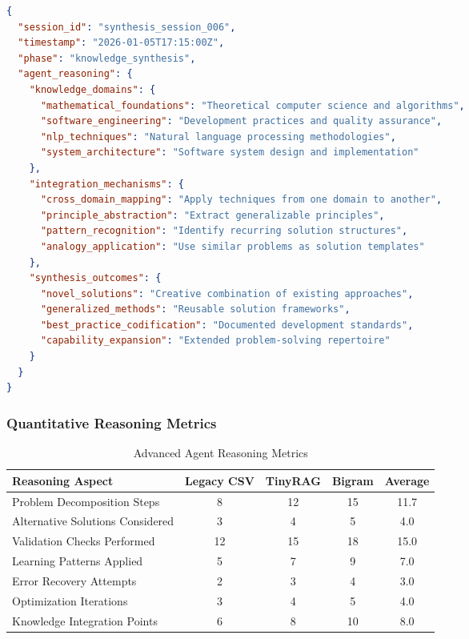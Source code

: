 \documentclass[12pt, a4paper]{article}
\begin{document}
\begin{lstlisting}[language=json, caption=Knowledge Integration Framework]
{
  "session_id": "synthesis_session_006",
  "timestamp": "2026-01-05T17:15:00Z",
  "phase": "knowledge_synthesis",
  "agent_reasoning": {
    "knowledge_domains": {
      "mathematical_foundations": "Theoretical computer science and algorithms",
      "software_engineering": "Development practices and quality assurance",
      "nlp_techniques": "Natural language processing methodologies",
      "system_architecture": "Software system design and implementation"
    },
    "integration_mechanisms": {
      "cross_domain_mapping": "Apply techniques from one domain to another",
      "principle_abstraction": "Extract generalizable principles",
      "pattern_recognition": "Identify recurring solution structures",
      "analogy_application": "Use similar problems as solution templates"
    },
    "synthesis_outcomes": {
      "novel_solutions": "Creative combination of existing approaches",
      "generalized_methods": "Reusable solution frameworks",
      "best_practice_codification": "Documented development standards",
      "capability_expansion": "Extended problem-solving repertoire"
    }
  }
}
\end{lstlisting}

\subsubsection{Quantitative Reasoning Metrics}

\begin{table}[H]
    \centering
    \caption{Advanced Agent Reasoning Metrics}
    \begin{tabular}{@{}lcccc@{}}
        \toprule
        \textbf{Reasoning Aspect} & \textbf{Legacy CSV} & \textbf{TinyRAG} & \textbf{Bigram} & \textbf{Average} \\
        \midrule
        Problem Decomposition Steps & 8 & 12 & 15 & 11.7 \\
        Alternative Solutions Considered & 3 & 4 & 5 & 4.0 \\
        Validation Checks Performed & 12 & 15 & 18 & 15.0 \\
        Learning Patterns Applied & 5 & 7 & 9 & 7.0 \\
        Error Recovery Attempts & 2 & 3 & 4 & 3.0 \\
        Optimization Iterations & 3 & 4 & 5 & 4.0 \\
        Knowledge Integration Points & 6 & 8 & 10 & 8.0 \\
        \bottomrule
    \end{tabular}
    \label{tab:reasoning_metrics}
\end{table}
\end{document}
